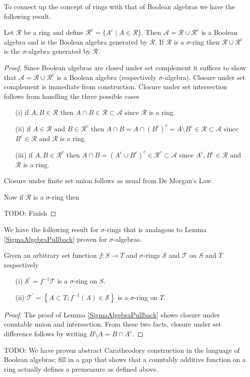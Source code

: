 To connect up the concept of rings with that of Boolean algebras we
have the following result.
\begin{lem}Let $\mathcal{R}$ be a ring and define $\mathcal{R}^c =
  \lbrace A^c \mid A \in \mathcal{R}\rbrace$.  Then $\mathcal{A} =
  \mathcal{R} \cup \mathcal{R}^c$ is a Boolean algebra and is the
  Boolean algebra generated by $\mathcal{R}$.  If $\mathcal{R}$ is a
  $\sigma$-ring then $\mathcal{R} \cup \mathcal{R}^c$ is the
  $\sigma$-algebra generated by $\mathcal{R}$.
\end{lem}
\begin{proof}Since Boolean algebras are closed under set complement it
  suffices to show that $\mathcal{A} = \mathcal{R} \cup \mathcal{R}^c$ is a Boolean
  algebra (respectively $\sigma$-algebra).  Closure under set
  complement is immediate from construction.  Closure under set
  intersection follows from handling the three possible cases
\begin{itemize}
\item[(i)]if $A, B \in \mathcal{R}$ then $A\cap B \in \mathcal{R}
  \subset \mathcal{A}$ since $\mathcal{R}$ is a ring.
\item[(ii)]if $A \in \mathcal{R}$ and $B \in \mathcal{R}^c$ then
  $A\cap B = A \cap (B^c)^c = A \setminus B^c \in \mathcal{R}
  \subset \mathcal{A}$ since $B^c \in \mathcal{R}$ and $\mathcal{R}$ is a ring.
\item[(iii)]if $A, B \in \mathcal{R}^c$ then $A \cap B = (A^c \cup
  B^c)^c \in \mathcal{R}^c
  \subset \mathcal{A}$ since $A^c, B^c \in \mathcal{R}$ and $\mathcal{R}$ is a ring.
\end{itemize}
Closure under finite set union follows as usual from De Morgan's Law.

Now if $\mathcal{R}$ is a $\sigma$-ring then 

TODO: Finish
\end{proof}

We have the following result for $\sigma$-rings that is analagous to
Lemma \ref{SigmaAlgebraPullback} proven for $\sigma$-algebras.
\begin{lem}\label{SigmaRingPullback}Given an arbitrary set function $f
  : S \to T$ and $\sigma$-rings $\mathcal{S}$ and $\mathcal{T}$ on
  $S$ and $T$ respectively 
\begin{itemize}
\item[(i)] $\mathcal{S}^\prime = f^{-1} \mathcal{T}$ is a
  $\sigma$-ring on $S$.
\item[(ii)] $\mathcal{T}^\prime = \left \{A \subset T ; f^{-1}(A) \in
      \mathcal{S} \right \}$ is a $\sigma$-ring on $T$.
\end{itemize}
\end{lem}
\begin{proof}
The proof of Lemma \ref{SigmaAlgebraPullback} shows closure under
countable union and intersection.  From these two facts, closure under
set difference follows by writing $B \setminus A = B \cap A^c$.
\end{proof}
 TODO: We have proven abstract Caratheodory construction in the
language of Boolean algebras; fill in a gap that shows that a
countably additive function on a ring actually defines a premeasure as
defined above.

